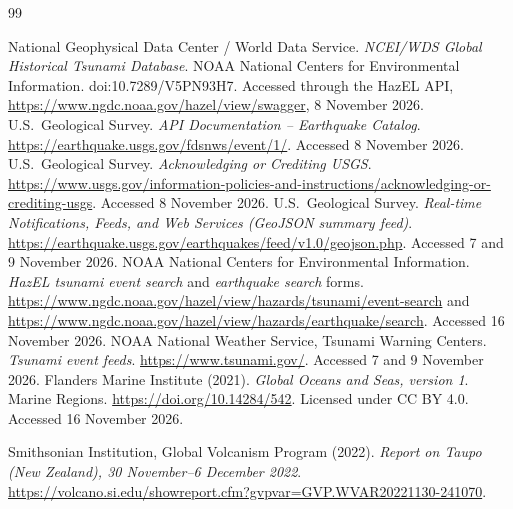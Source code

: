 \documentclass[a4paper,11pt,oneside]{book}
\begin{document}
\begin{thebibliography}{99}
\small
\raggedright
\setlength{\bibsep}{2pt}
 National Geophysical Data Center / World Data Service. \emph{NCEI/WDS Global Historical Tsunami Database}. NOAA National Centers for Environmental Information. doi:10.7289/V5PN93H7. Accessed through the HazEL API, \url{https://www.ngdc.noaa.gov/hazel/view/swagger}, 8 November 2026.
 U.S.\ Geological Survey. \emph{API Documentation -- Earthquake Catalog}. \url{https://earthquake.usgs.gov/fdsnws/event/1/}. Accessed 8 November 2026.
 U.S.\ Geological Survey. \emph{Acknowledging or Crediting USGS}. \url{https://www.usgs.gov/information-policies-and-instructions/acknowledging-or-crediting-usgs}. Accessed 8 November 2026.
 U.S.\ Geological Survey. \emph{Real-time Notifications, Feeds, and Web Services (GeoJSON summary feed)}. \url{https://earthquake.usgs.gov/earthquakes/feed/v1.0/geojson.php}. Accessed 7 and 9 November 2026.
 NOAA National Centers for Environmental Information. \emph{HazEL tsunami event search} and \emph{earthquake search} forms. \url{https://www.ngdc.noaa.gov/hazel/view/hazards/tsunami/event-search} and \url{https://www.ngdc.noaa.gov/hazel/view/hazards/earthquake/search}. Accessed 16 November 2026.
 NOAA National Weather Service, Tsunami Warning Centers. \emph{Tsunami event feeds}. \url{https://www.tsunami.gov/}. Accessed 7 and 9 November 2026.
Flanders Marine Institute (2021).
\emph{Global Oceans and Seas, version 1}.
Marine Regions.
\url{https://doi.org/10.14284/542}.
Licensed under CC BY 4.0.
Accessed 16 November 2026.

Smithsonian Institution, Global Volcanism Program (2022).
\emph{Report on Taupo (New Zealand),
30 November--6 December 2022}.
\url{https://volcano.si.edu/showreport.cfm?gvpvar=GVP.WVAR20221130-241070}.


\end{thebibliography}
\end{document}
